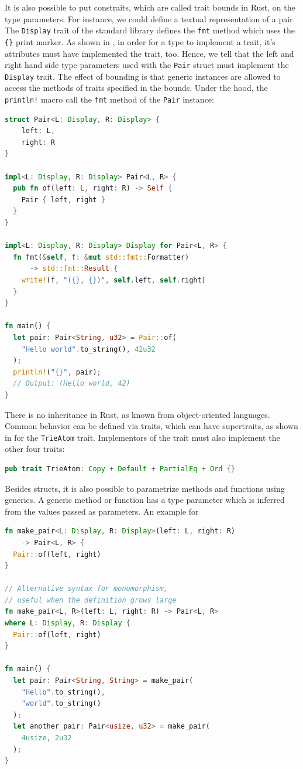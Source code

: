 \documentclass[paper=a4,%
  twoside,%
  BCOR4mm,%
  abstract=true,%
  toc=bibliography,%
  chapterprefix=true,%
  toc=bibliographynumbered,%
  open=right,%
  english,%
  pagesize=pdftex]{scrreprt}
\begin{document}
It is also possible to put constraits, which are called trait bounds in Rust, on the type parameters. For instance, we could define a textual representation of a pair. The \lstinline{Display} trait of the standard library defines the \lstinline{fmt} method which uses the \lstinline|{}| print marker. As shown in , in order for a type to implement a trait, it's attributes must have implemented the trait, too. Hence, we tell that the left and right hand side type parameters used with the \lstinline{Pair} struct must implement the \lstinline{Display} trait. The effect of bounding is that generic instances are allowed to access the methods of traits specified in the bounds. Under the hood, the \lstinline{println!} macro call the \lstinline{fmt} method of the \lstinline{Pair} instance:
\begin{lstlisting}[language=Rust, style=boxed, caption={}, label=lst:example-trait-bounds]
struct Pair<L: Display, R: Display> {
    left: L,
    right: R
}

impl<L: Display, R: Display> Pair<L, R> {
  pub fn of(left: L, right: R) -> Self {
    Pair { left, right }
  }
}

impl<L: Display, R: Display> Display for Pair<L, R> {
  fn fmt(&self, f: &mut std::fmt::Formatter)
      -> std::fmt::Result {
    write!(f, "({}, {})", self.left, self.right)
  }
}

fn main() {
  let pair: Pair<String, u32> = Pair::of(
    "Hello world".to_string(), 42u32
  );
  println!("{}", pair);
  // Output: (Hello world, 42)
}
\end{lstlisting}

There is no inheritance in Rust, as known from object-oriented languages. Common behavior can be defined via traits, which can have supertraits, as shown in  for the \lstinline{TrieAtom} trait. Implementors of the trait must also implement the other four traits:
\begin{lstlisting}[language=Rust, style=boxed, caption={An example trait from the \textit{trying} crate which we evaluate the approach on}, label=lst:trying-supertraits]
pub trait TrieAtom: Copy + Default + PartialEq + Ord {}
\end{lstlisting}

Besides structs, it is also possible to parametrize methods and functions using generics. A generic method or function has a type parameter which is inferred from the values passed as parameters. An example for
\begin{lstlisting}[language=Rust, style=boxed, caption={Variants of defining a generic function}, label=lst:function-monomorphization]
fn make_pair<L: Display, R: Display>(left: L, right: R)
    -> Pair<L, R> {
  Pair::of(left, right)
}

// Alternative syntax for monomorphism,
// useful when the definition grows large
fn make_pair<L, R>(left: L, right: R) -> Pair<L, R>
where L: Display, R: Display {
  Pair::of(left, right)
}

fn main() {
  let pair: Pair<String, String> = make_pair(
    "Hello".to_string(),
    "world".to_string()
  );
  let another_pair: Pair<usize, u32> = make_pair(
    4usize, 2u32
  );
}
\end{lstlisting}
\end{document}
